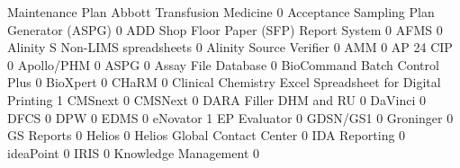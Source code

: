 \documentclass{article}
\begin{document}
\begin{Schunk}
\begin{Soutput}
                                                            Maintenance Plan
  Abbott Transfusion Medicine                                              0
  Acceptance Sampling Plan Generator (ASPG)                                0
  ADD Shop Floor Paper (SFP) Report System                                 0
  AFMS                                                                     0
  Alinity S Non-LIMS spreadsheets                                          0
  Alinity Source Verifier                                                  0
  AMM                                                                      0
  AP 24 CIP                                                                0
  Apollo/PHM                                                               0
  ASPG                                                                     0
  Assay File Database                                                      0
  BioCommand Batch Control Plus                                            0
  BioXpert                                                                 0
  CHaRM                                                                    0
  Clinical Chemistry Excel Spreadsheet for Digital Printing                1
  CMSnext                                                                  0
  CMSNext                                                                  0
  DARA Filler DHM and RU                                                   0
  DaVinci                                                                  0
  DFCS                                                                     0
  DPW                                                                      0
  EDMS                                                                     0
  eNovator                                                                 1
  EP Evaluator                                                             0
  GDSN/GS1                                                                 0
  Groninger                                                                0
  GS Reports                                                               0
  Helios                                                                   0
  Helios Global Contact Center                                             0
  IDA Reporting                                                            0
  ideaPoint                                                                0
  IRIS                                                                     0
  Knowledge Management                                                     0

\end{Soutput}
\end{Schunk}
\end{document}
